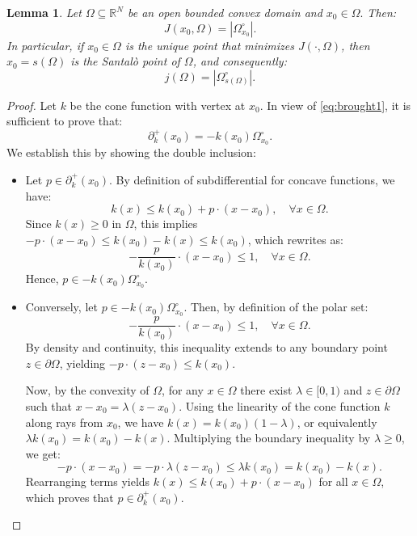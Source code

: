 \documentclass[10pt,a4paper]{amsart}
\newtheorem{lemma}[theorem]{Lemma}
\numberwithin{equation}{section}
\begin{document}
\begin{lemma}
Let $\Omega \subseteq\mathbb{R}^N$ be an open bounded convex domain and $x_0 \in \Omega.$ Then:
\begin{equation}\label{eq:brought2}
J(x_0, \Omega)=|\Omega^\circ_{x_0}|.
\end{equation}
In particular, if $x_0 \in \Omega$ is the unique point that minimizes $J(\cdot, \Omega)$, then $x_0=s(\Omega)$ is the Santalò point of $\Omega$, and consequently:
\begin{equation}\label{eq:brought3}
j(\Omega)=|\Omega^\circ_{s(\Omega)}|.
\end{equation}
\end{lemma}

\begin{proof}
Let $k$ be the cone function with vertex at $x_0$. In view of \eqref{eq:brought1}, it is sufficient to prove that:
\[
\partial^+_k(x_0) = -k(x_0)\Omega^\circ_{x_0}.
\]
We establish this by showing the double inclusion:
\begin{itemize}
    \item[$\mathbf{\subseteq}$:] Let $p \in \partial^+_k(x_0)$. By definition of subdifferential for concave functions, we have:
    \[
    k(x) \leq k(x_0) + p \cdot (x - x_0), \quad \forall x \in \Omega.
    \]
    Since $k(x) \geq 0$ in $\Omega$, this implies $-p \cdot (x - x_0) \leq k(x_0) - k(x) \leq k(x_0)$, which rewrites as:
    \[
    -\frac{p}{k(x_0)} \cdot (x - x_0) \leq 1, \quad \forall x \in \Omega.
    \]
    Hence, $p \in -k(x_0)\Omega^\circ_{x_0}$.
    
    \item[$\mathbf{\supseteq}$:] Conversely, let $p \in -k(x_0)\Omega^\circ_{x_0}$. Then, by definition of the polar set:
    \[
    -\frac{p}{k(x_0)} \cdot (x - x_0) \leq 1, \quad \forall x \in \Omega.
    \]
    By density and continuity, this inequality extends to any boundary point $z \in \partial \Omega$, yielding $-p \cdot (z - x_0) \leq k(x_0)$. 
    
    Now, by the convexity of $\Omega$, for any $x \in \Omega$ there exist $\lambda \in [0,1)$ and $z \in \partial \Omega$ such that $x - x_0 = \lambda(z - x_0)$. Using the linearity of the cone function $k$ along rays from $x_0$, we have $k(x) = k(x_0)(1 - \lambda)$, or equivalently $\lambda k(x_0) = k(x_0) - k(x)$. Multiplying the boundary inequality by $\lambda \geq 0$, we get:
    \[
    -p \cdot (x - x_0) = -p \cdot \lambda(z - x_0) \leq \lambda k(x_0) = k(x_0) - k(x).
    \]
    Rearranging terms yields $k(x) \leq k(x_0) + p \cdot (x - x_0)$ for all $x \in \Omega$, which proves that $p \in \partial^+_k(x_0)$.
\end{itemize}


\end{proof}
\end{document}
